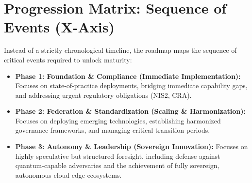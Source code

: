 \documentclass[11pt,a4paper]{article}
\begin{document}
\section{Progression Matrix: Sequence of Events (X-Axis)}
Instead of a strictly chronological timeline, the roadmap maps the sequence of critical events required to unlock maturity:
\begin{itemize}
    \item \textbf{Phase 1: Foundation \& Compliance (Immediate Implementation):} Focuses on state-of-practice deployments, bridging immediate capability gaps, and addressing urgent regulatory obligations (NIS2, CRA).
    \item \textbf{Phase 2: Federation \& Standardization (Scaling \& Harmonization):} Focuses on deploying emerging technologies, establishing harmonized governance frameworks, and managing critical transition periods.
    \item \textbf{Phase 3: Autonomy \& Leadership (Sovereign Innovation):} Focuses on highly speculative but structured foresight, including defense against quantum-capable adversaries and the achievement of fully sovereign, autonomous cloud-edge ecosystems.
\end{itemize}
\end{document}
